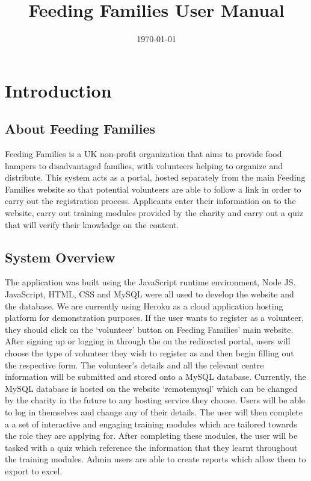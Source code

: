 \documentclass[12pt]{article}
\title{Feeding Families User Manual}
\date{\today}
\begin{document}
\maketitle{}

\tableofcontents

\clearpage
\newpage

\section{Introduction} %
\subsection{About Feeding Families}
Feeding Families is a UK non-profit organization that aims to provide food hampers to disadvantaged families, with volunteers helping to organize and distribute. This system acts as a portal, hosted separately from the main Feeding Families website so that potential volunteers are able to follow a link in order to carry out the registration process. Applicants enter their information on to the website, carry out training modules provided by the charity and carry out a quiz that will verify their knowledge on the content. 

\subsection{System Overview}
The application was built using the JavaScript runtime environment, Node JS. JavaScript, HTML, CSS and MySQL were all used to develop the website and the database. We are currently using Heroku as a cloud application hosting platform for demonstration purposes. 
If the user wants to register as a volunteer, they should click on the ‘volunteer’ button on Feeding Families’ main website. After signing up or logging in through the on the redirected portal, users will choose the type of volunteer they wish to register as and then begin filling out the respective form. The volunteer’s details and all the relevant centre information will be submitted and stored onto a MySQL database. Currently, the MySQL database is hosted on the website ‘remotemysql’ which can be changed by the charity in the future to any hosting service they choose. Users will be able to log in themselves and change any of their details. The user will then complete a a set of interactive and engaging training modules which are tailored towards the role they are applying for. After completing these modules, the user will be tasked with a quiz which reference the information that they learnt throughout the training modules. Admin users are able to create reports which allow them to export to excel.
\end{document}
